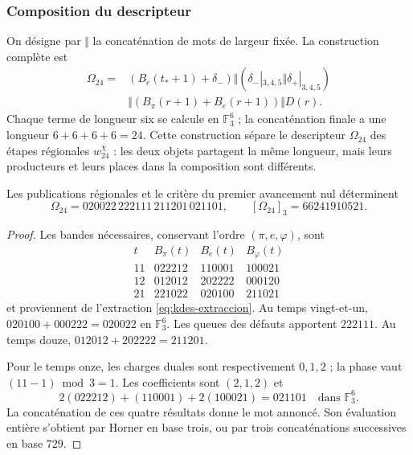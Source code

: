 \subsubsection{Composition du descripteur}

On désigne par $\Vert$ la concaténation de mots de largeur fixée.
La construction complète est
\begin{equation}
 \begin{split}
 \Omega_{24}={}&
 (B_e(t_*+1)+\delta_-)
 \Vert (\delta_-|_{3,4,5}\Vert\delta_+|_{3,4,5})\\
 &\Vert(B_\pi(r+1)+B_e(r+1))\Vert D(r).
 \end{split}
 \label{eq:kdes-omega}
\end{equation}
Chaque terme de longueur six se calcule en $\mathbb F_3^6$ ; la
concaténation finale a une longueur $6+6+6+6=24$. Cette construction
sépare le descripteur $\Omega_{24}$ des étapes régionales
$w_{24}^{\chi}$ : les deux objets partagent la même longueur, mais leurs producteurs
et leurs places dans la composition sont différents.

\begin{proposition}
Les publications régionales et le critère du premier avancement nul déterminent
\[
 \Omega_{24}=020022\,222111\,211201\,021101,
 \qquad [\Omega_{24}]_3=66241910521.
\]
\end{proposition}
\begin{proof}
Les bandes nécessaires, conservant l'ordre $(\pi,e,\varphi)$, sont
\[
 \begin{array}{c|ccc}
 t&B_\pi(t)&B_e(t)&B_\varphi(t)\\\hline
 11&022212&110001&100021\\
 12&012012&202222&000120\\
 21&221022&020100&211021
 \end{array}
\]
et proviennent de l'extraction \eqref{eq:kdes-extraccion}. Au temps
vingt-et-un,
$020100+000222=020022$ en $\mathbb F_3^6$. Les queues des défauts
apportent $222111$. Au temps douze,
$012012+202222=211201$.

Pour le temps onze, les charges duales sont respectivement $0,1,2$ ; la phase vaut $(11-1)\bmod3=1$. Les coefficients sont $(2,1,2)$ et
\[
 2(022212)+(110001)+2(100021)=021101
 \quad\text{dans }\mathbb F_3^6.
\]
La concaténation de ces quatre résultats donne le mot annoncé.
Son évaluation entière s'obtient par Horner en base trois, ou par trois
concaténations successives en base $729$.
\end{proof}

